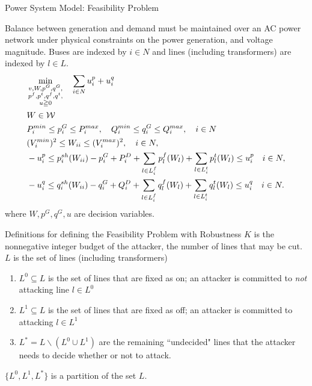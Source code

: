 \documentclass[xcolor=dvipsnames]{beamer}
\newcommand{\p}[1]{p^{#1}}
\newcommand{\q}[1]{q^{#1}}
\newcommand{\ii}{i}
\newcommand{\llll}{l}
\newcommand{\from}{f}
\newcommand{\tto}{t}
\newcommand{\WW}{W}
\newcommand{\WSet}{\mathcal{W}}
\newcommand{\Lines}{L}
\begin{document}
\begin{frame}{Power System Model: Feasibility Problem}
\begin{footnotesize}
Balance between generation and demand must be maintained over an AC power network under physical constraints on the power generation, and voltage magnitude.
Buses are indexed by $i \in N$ and lines (including transformers) are indexed by $l \in L$.
\begin{subequations}
\begin{align}
&\min_{\substack{v,W,p^G,q^G,\\ p^f,p^t,q^f,q^t,\\ u \geqq 0}} \quad 
  \sum_{i \in N} u_i^p + u_i^q  \notag \\
  & W \in \WSet \notag\\
  & P_i^{min} \leq p_i^G \leq P_i^{max}, \quad Q_i^{min} \leq q_i^G \leq Q_i^{max}, \quad i\in N \notag \\
  & (V_i^{min})^2 \leq W_{ii} \leq (V_i^{max})^2,\quad i\in N, \notag \\
  & -u_i^p \le p_i^{sh}(\WW_{ii}) - p^G_i + P^D_i 
	+ \sum_{\llll \in \Lines_\ii^{\from} } \p{\from}_{\llll}(\WW_\llll)  
	+\sum_{\llll \in \Lines_\ii^{\tto}   } \p{\tto}_{\llll}(\WW_\llll)
	\le u_i^p \quad i\in N, \notag\\ 
  & -u_i^q \le q_i^{sh}(\WW_{ii}) - q^G_i + Q^D_i 
	+ \sum_{\llll \in \Lines_\ii^{\from}} \q{\from}_{\llll}(\WW_\llll)
	+ \sum_{\llll \in \Lines_\ii^{\tto} } \q{\tto}_{\llll}(\WW_\llll)
	\le u_i^q \quad i\in N. \notag
\end{align}
\end{subequations}
where $W,p^G,q^G,u$ are decision variables. 
\end{footnotesize}
\end{frame}

\begin{frame}{Definitions for defining the Feasibility Problem with Robustness}
$K$ is the nonnegative integer budget of the attacker, the number of lines that may be cut.
$L$ is the set of lines (including transformers)
\begin{enumerate}
\item $L^0 \subseteq L$ is the set of lines that are fixed as on; an attacker is committed to \emph{not} attacking line $l \in L^0$
\item $L^1 \subseteq L$ is the set of lines that are fixed as off; an attacker is committed to attacking $l \in L^1$
\item $L^* = L \backslash (L^0 \cup L^1)$ are the remaining ``undecided" lines that the attacker needs to decide whether or not to attack.
\end{enumerate}
$\{ L^0, L^1, L^*\}$ is a partition of the set $L$.
\end{frame}
\end{document}
